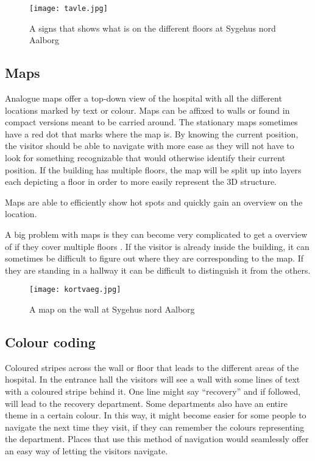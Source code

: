   \begin{figure}[ht!]
    \centering
    \texttt{[image: tavle.jpg]}
    \caption{A signs that shows what is on the different floors at Sygehus nord Aalborg}
    \label{overflow}
  \end{figure}

\subsection{Maps}
Analogue maps\cite{map} offer a top-down view of the hospital with all the different locations marked by text or colour\cite{art_Osborne}. Maps can be affixed to walls or found in compact versions meant to be carried around. The stationary maps sometimes have a red dot that marks where the map is. By knowing the current position, the visitor should be able to navigate with more ease\cite{map_survey} as they will not have to look for something recognizable that would otherwise identify their current position. If the building has multiple floors, the map will be split up into layers each depicting a floor in order to more easily represent the 3D structure.

Maps are able to efficiently show hot spots and quickly gain an overview on the location\cite{pros_analog_map}.

A big problem with maps is they can become very complicated to get a overview of if they cover multiple floors \cite{map_confusing}. If the visitor is already inside the building, it can sometimes be difficult to figure out where they are corresponding to the map. If they are standing in a hallway it can be difficult to distinguish it from the others. 

  \begin{figure}[ht!]
  \centering
  \texttt{[image: kortvaeg.jpg]}
  \caption{A map on the wall at Sygehus nord Aalborg}
  \label{overflow}
  \end{figure}
\subsection{Colour coding}
Coloured stripes across the wall or floor that leads to the different areas of the hospital. In the entrance hall the visitors will see a wall with some lines of text with a coloured stripe behind it. One line might say \enquote{recovery} and if followed, will lead to the recovery department. Some departments also have an entire theme in a certain colour. In this way, it might become easier for some people to navigate the next time they visit, if they can remember the colours representing the department. 
Places that use this method of navigation would seamlessly offer an easy way of letting the visitors navigate.

